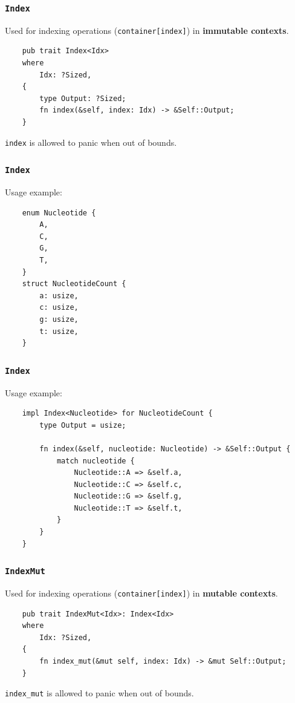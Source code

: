 \documentclass[aspectratio=1610,t]{beamer}
\begin{document}

\begin{frame}[fragile]
\frametitle{\texttt{Index}}
Used for indexing operations (\texttt{container[index]}) in \textbf{immutable contexts}.

\begin{verbatim}
    pub trait Index<Idx> 
    where
        Idx: ?Sized, 
    {
        type Output: ?Sized;
        fn index(&self, index: Idx) -> &Self::Output;
    }
\end{verbatim}

\texttt{index} is allowed to panic when out of bounds.
\end{frame}


\begin{frame}[fragile]
\frametitle{\texttt{Index}}
Usage example:

\begin{verbatim}
    enum Nucleotide {
        A,
        C,
        G,
        T,
    }
    struct NucleotideCount {
        a: usize,
        c: usize,
        g: usize,
        t: usize,
    }
\end{verbatim}
\end{frame}


\begin{frame}[fragile]
\frametitle{\texttt{Index}}
Usage example:

\begin{verbatim}
    impl Index<Nucleotide> for NucleotideCount {
        type Output = usize;

        fn index(&self, nucleotide: Nucleotide) -> &Self::Output {
            match nucleotide {
                Nucleotide::A => &self.a,
                Nucleotide::C => &self.c,
                Nucleotide::G => &self.g,
                Nucleotide::T => &self.t,
            }
        }
    }
\end{verbatim}
\end{frame}


\begin{frame}[fragile]
\frametitle{\texttt{IndexMut}}
Used for indexing operations (\texttt{container[index]}) in \textbf{mutable contexts}.

\begin{verbatim}
    pub trait IndexMut<Idx>: Index<Idx> 
    where
        Idx: ?Sized, 
    {
        fn index_mut(&mut self, index: Idx) -> &mut Self::Output;
    }
\end{verbatim}

\texttt{index\_mut} is allowed to panic when out of bounds.
\end{frame}
\end{document}
